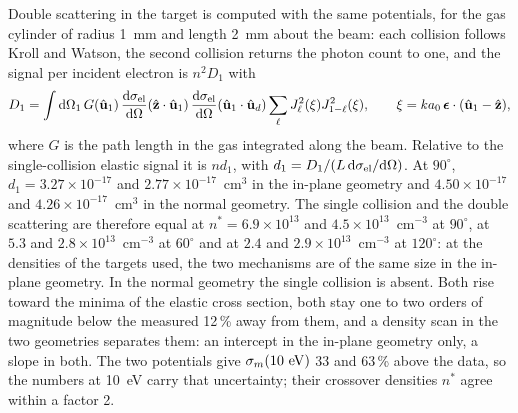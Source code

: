 \documentclass[11pt]{article}
\numberwithin{equation}{section}
\newcommand{\dd}{\mathrm d}
\begin{document}
Double scattering in the target is computed with the same potentials, for the gas cylinder of
radius 1~mm and length 2~mm about the beam: each collision follows Kroll and Watson, the second
collision returns the photon count to one, and the signal per incident electron is $n^2D_1$ with
\begin{equation}
D_1=\int\dd\Omega_1\,G(\hat{\mathbf u}_1)\,\frac{\dd\sigma_{\rm el}}{\dd\Omega}(\hat{\mathbf z}\cdot\hat{\mathbf u}_1)\,
\frac{\dd\sigma_{\rm el}}{\dd\Omega}(\hat{\mathbf u}_1\cdot\hat{\mathbf u}_d)\sum_\ell J_\ell^2(\xi)J_{1-\ell}^2(\xi),\qquad
\xi=ka_0\,\boldsymbol\epsilon\cdot(\hat{\mathbf u}_1-\hat{\mathbf z}),
\label{eq:D1}
\end{equation}
where $G$ is the path length in the gas integrated along the beam. Relative to the single-collision
elastic signal it is $nd_1$, with $d_1=D_1/(L\,\dd\sigma_{\rm el}/\dd\Omega)$. At $90^\circ$,
$d_1=3.27\times10^{-17}$ and $2.77\times10^{-17}$~cm$^3$ in the in-plane geometry and $4.50\times10^{-17}$
and $4.26\times10^{-17}$~cm$^3$ in the normal geometry. The single collision and the double scattering
are therefore equal at $n^*=6.9\times10^{13}$ and $4.5\times10^{13}$~cm$^{-3}$ at $90^\circ$, at $5.3$ and
$2.8\times10^{13}$~cm$^{-3}$ at $60^\circ$ and at $2.4$ and $2.9\times10^{13}$~cm$^{-3}$ at $120^\circ$: at the
densities of the targets used, the two mechanisms are of the same size in the in-plane geometry.
In the normal geometry the single collision is absent. Both rise toward the minima of the elastic
cross section, both stay one to two orders of magnitude below the measured 12\,\% away from them,
and a density scan in the two geometries separates them: an intercept in the in-plane geometry
only, a slope in both. The two potentials give $\sigma_m(10~{\rm eV})$ 33 and 63\,\% above the data,
so the numbers at 10~eV carry that uncertainty; their crossover densities $n^*$ agree within a
factor 2.
\end{document}
